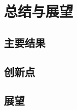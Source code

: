 \begin{conclusion}
\label{conclusion}
\chapter{总结与展望}
\section{主要结果}
\section{创新点}
\section{展望}
\end{conclusion}


